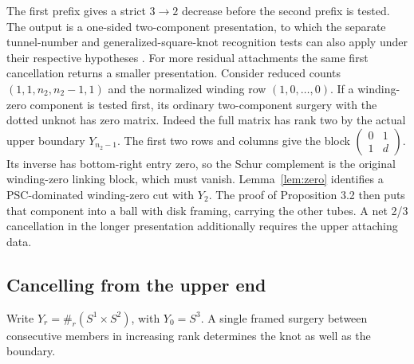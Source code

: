 \documentclass[11pt,letterpaper]{article}
\numberwithin{equation}{section}
\theoremstyle{remark}
\begin{document}
The first prefix gives a strict \(3\to2\) decrease before
the second prefix is tested. The output is a one-sided
two-component presentation, to which the separate
tunnel-number and generalized-square-knot recognition tests
can also apply under their respective hypotheses
\cite[one-sided recognition and stabilization]{Baker2026MarkedHeights}
\cite{MeierSchirmerZupan2016Trisections,MeierZupan2022SquareKnots}.
For more residual attachments the same first cancellation
returns a smaller presentation. Consider reduced counts
\((1,1,n_2,n_2-1,1)\) and the normalized winding row
\((1,0,\ldots,0)\). If a winding-zero component is tested first,
its ordinary two-component surgery with the dotted unknot
has zero matrix. Indeed the full matrix has rank two by the
actual upper boundary \(Y_{n_2-1}\).
The first two rows and columns give the block
\(\left(\begin{smallmatrix}0&1\\1&d\end{smallmatrix}\right)\).
Its inverse has bottom-right entry zero, so the Schur
complement is the original winding-zero linking block,
which must vanish. Lemma~\ref{lem:zero} identifies a
PSC-dominated winding-zero cut with \(Y_2\).
The proof of Proposition 3.2 then puts that component into
a ball with disk framing, carrying the other tubes. A net
2/3 cancellation in the longer presentation additionally
requires the upper attaching data.

\subsection{Cancelling from the upper end}\label{sec:last}
Write \(Y_r=\#_r(S^1\times S^2)\), with \(Y_0=S^3\).
A single framed surgery between consecutive members in increasing
rank determines the knot as well as the boundary.
\end{document}
